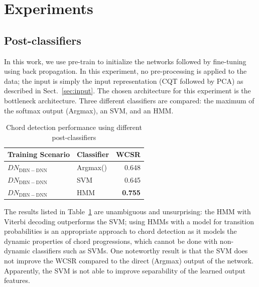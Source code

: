\documentclass{article}
\begin{document}
\section{Experiments}

\subsection{Post-classifiers}
In this work, we use pre-train to initialize the networks followed by fine-tuning using back propagation. 
In this experiment, no pre-processing is applied to the data; the input is simply the input representation (CQT followed by PCA) as described in Sect.~\ref{sec:input}. The chosen architecture for this experiment is the bottleneck architecture. 
Three different classifiers are compared: the maximum of the softmax output (Argmax), an SVM, and an HMM. 
\begin{table}
\centering
\begin{tabular*}{\columnwidth}{@{\extracolsep{\fill}}llr}
\toprule
\textbf{Training Scenario} & \textbf{Classifier} & \textbf{WCSR}  \\ \hline

$DN_\mathrm{DBN-DNN}$         & Argmax()            & 0.648 \\ 
$DN_\mathrm{DBN-DNN}$          & SVM            & 0.645 \\ 
$DN_\mathrm{DBN-DNN}$         &  HMM           & \textbf{0.755} \\ \bottomrule
\end{tabular*}
\caption{Chord detection performance using different post-classifiers}
\label{tab:dbn-dnn}
\end{table}

The results listed in Table~\ref{tab:dbn-dnn} are unambiguous and unsurprising: the HMM with Viterbi decoding outperforms the SVM; using HMMs with a model for transition probabilities is an appropriate approach to chord detection as it models the dynamic properties of chord progressions, which cannot be done with non-dynamic classifiers such as SVMs. One noteworthy result is that the SVM does not improve the WCSR compared to the direct (Argmax) output of the network. Apparently, the SVM is not able to improve separability of the learned output features.
\end{document}
